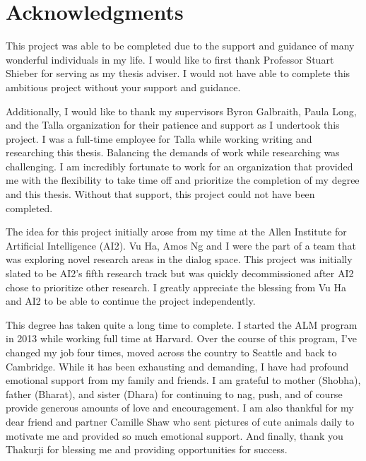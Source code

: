 
\chapter*{Acknowledgments}

This project was  able to be completed due to the support and guidance of many wonderful individuals in my life. I would like to first thank Professor Stuart Shieber for serving as my thesis adviser. I would not have able to complete this ambitious project without your support and guidance. 

Additionally, I would like to thank my supervisors Byron Galbraith, Paula Long, and the Talla organization for their patience and support as I undertook this project. I was a full-time employee for Talla while working writing and researching this thesis. Balancing the demands of work while researching was challenging. I am incredibly fortunate to work for an organization that provided me with the flexibility to take time off and prioritize the completion of my degree and this thesis. Without that support, this project could not have been completed.

The idea for this project initially arose from my time at the Allen Institute for Artificial Intelligence (AI2). Vu Ha, Amos Ng and I were the part of a team that was exploring novel research areas in the dialog space. This project was initially slated to be AI2's fifth research track but was quickly decommissioned after AI2 chose to prioritize other research. I greatly appreciate the blessing from Vu Ha and AI2 to be able to continue the project independently. 

This degree has taken quite a long time to complete. I started the ALM program in 2013 while working full time at Harvard. Over the course of this program, I've changed my job four times, moved across the country to Seattle and back to Cambridge. While it has been exhausting and demanding, I have had profound emotional support from my family and friends. I am grateful to mother (Shobha), father (Bharat), and sister (Dhara) for continuing to nag, push, and of course provide generous amounts of love and encouragement. I am also thankful for my dear friend and partner Camille Shaw who sent pictures of cute animals daily to motivate me and provided so much emotional support. And finally, thank you Thakurji for blessing me and providing opportunities for success.  


